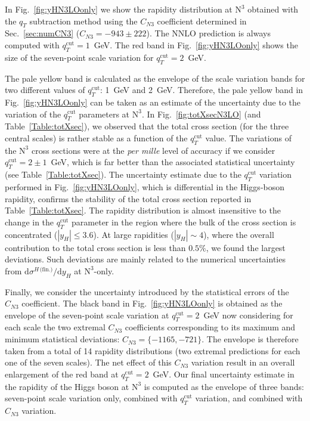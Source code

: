\documentclass[12pt]{article}
\DeclareRobustCommand{\qt}{\ensuremath{q_T}\xspace}
\DeclareRobustCommand{\qtcut}{\ensuremath{q_T^\mathrm{cut}}\xspace}
\DeclareRobustCommand{\rd}{\ensuremath{\mathrm{d}}}
\DeclareRobustCommand{\fin}{\text{(fin.)}\xspace}
\DeclareRobustCommand{\LO}{\text{LO}\xspace}
\DeclareRobustCommand{\N}[1]{\ensuremath{\text{N}^{#1}}} %
\begin{document}
In Fig.~\ref{fig:yHN3LOonly} we show the rapidity distribution at \N3\LO obtained with the $\qt$ subtraction method using the $C_{N3}$ coefficient determined in Sec.~\ref{sec:numCN3} ($C_{N3}=-943 \pm 222$). The NNLO prediction is always computed with $\qtcut=1$~GeV. 
The red band in Fig.~\ref{fig:yHN3LOonly} shows the size of the seven-point scale variation for $\qtcut=2$~GeV. 

The pale yellow band is calculated as the envelope of the scale variation bands for two different values of $\qtcut$: 1~GeV and 2~GeV. Therefore, the pale yellow band in Fig.~\ref{fig:yHN3LOonly} can be taken as an estimate of the uncertainty due to the variation of the $\qtcut$ parameters at \N3\LO. In Fig.~\ref{fig:totXsecN3LO} (and Table~\ref{Table:totXsec}), we observed that the total cross section (for the three central scales) is rather stable as a function of the $\qtcut$ value. The variations of the \N3\LO cross sections were at the \textit{per mille} level of accuracy if we consider  $\qtcut=2 \pm 1$~GeV, which is far better than the associated statistical uncertainty (see Table~\ref{Table:totXsec}). The uncertainty estimate due to the $\qtcut$ variation performed in Fig.~\ref{fig:yHN3LOonly}, which is differential in the Higgs-boson rapidity, confirms the stability of the total cross section reported in Table~\ref{Table:totXsec}. 
The rapidity distribution is almost insensitive to the change in the $\qtcut$ parameter in the region where the bulk of the cross section is concentrated ($|y_{H}| \leq 3.6$). At large rapidities ($|y_{H}| \sim 4$), where the overall contribution to the total cross section is less than $0.5\%$, we found the largest deviations. Such deviations are mainly related to the numerical uncertainties from $\rd\sigma^{H\,\fin}/\rd y_H$ at  \N3\LO-only.
 
Finally, we consider the uncertainty introduced by the statistical errors of the $C_{N3}$ coefficient. The black band in Fig.~\ref{fig:yHN3LOonly} is obtained as the envelope of the seven-point scale variation at $\qtcut=2$~GeV now considering for each scale the two extremal $C_{N3}$ coefficients corresponding to its maximum and minimum statistical deviations: $C_{N3} =\{-1165,-721\}$. The envelope is therefore taken from a total of 14 rapidity distributions (two extremal predictions for each one of the seven scales). The net effect of this $C_{N3}$ variation result in an overall enlargement of the red band at $\qtcut=2$~GeV. Our final uncertainty estimate in the rapidity of the Higgs boson at \N3\LO is computed as the envelope of three bands: seven-point scale variation only, combined with $\qtcut$ variation, and combined with $C_{N3}$ variation. 
\end{document}

